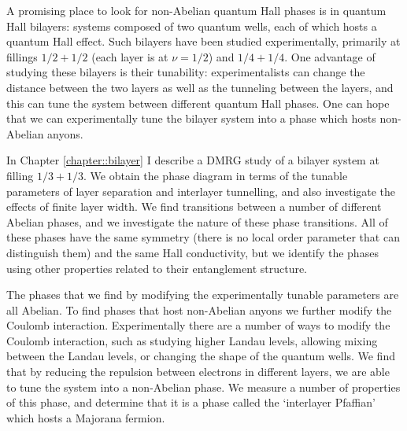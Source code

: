 A promising place to look for non-Abelian quantum Hall phases is in quantum Hall bilayers: systems composed of two quantum wells, each of which hosts a quantum Hall effect. Such bilayers have been studied experimentally, primarily at fillings $1/2+1/2$ (each layer is at $\nu=1/2$) and $1/4+1/4$\cite{JimReview}. One advantage of studying these bilayers is their tunability: experimentalists can change the distance between the two layers as well as the tunneling between the layers, and this can tune the system between different quantum Hall phases. One can hope that we can experimentally tune the bilayer system into a phase which hosts non-Abelian anyons.

In Chapter \ref{chapter::bilayer} I describe a DMRG study of a bilayer system at filling $1/3+1/3$. We obtain the phase diagram in terms of the tunable parameters of layer separation and interlayer tunnelling, and also investigate the effects of finite layer width. We find transitions between a number of different Abelian phases, and we investigate the nature of these phase transitions. All of these phases have the same symmetry (there is no local order parameter that can distinguish them) and the same Hall conductivity, but we identify the phases using other properties related to their entanglement structure.

The phases that we find by modifying the experimentally tunable parameters are all Abelian. To find phases that host non-Abelian anyons we further modify the Coulomb interaction. Experimentally there are a number of ways to modify the Coulomb interaction, such as studying higher Landau levels, allowing mixing between the Landau levels, or changing the shape of the quantum wells. We find that by reducing the repulsion between electrons in different layers, we are able to tune the system into a non-Abelian phase. We measure a number of properties of this phase, and determine that it is a phase called the `interlayer Pfaffian' which hosts a Majorana fermion.




